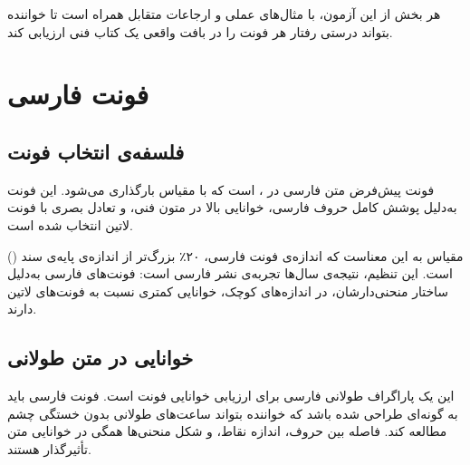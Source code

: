 \documentclass{matinbook}
\begin{document}
هر بخش از این آزمون، با مثال‌های عملی و ارجاعات متقابل همراه است
تا خواننده بتواند درستی رفتار هر فونت را در بافت واقعی یک کتاب
فنی ارزیابی کند.

\clearpage

\tableofcontents
\clearpage

\listoffigures
\clearpage

\listoftables
\clearpage

\mainmatter
\mainmattergeometry

\chapter{فونت فارسی}
\label{chap:font-persian}

\section{فلسفه‌ی انتخاب فونت}
\label{sec:font-persian-philosophy}

فونت پیش‌فرض متن فارسی در ،  است
که با مقیاس  بارگذاری می‌شود. این فونت به‌دلیل پوشش کامل
حروف فارسی، خوانایی بالا در متون فنی، و تعادل بصری با فونت لاتین
 انتخاب شده است.

مقیاس  به این معناست که اندازه‌ی فونت فارسی، ۲۰٪ بزرگ‌تر از
اندازه‌ی پایه‌ی سند (\pnum{۱۰pt}) است. این تنظیم، نتیجه‌ی سال‌ها تجربه‌ی
نشر فارسی است: فونت‌های فارسی به‌دلیل ساختار منحنی‌دارشان، در
اندازه‌های کوچک، خوانایی کمتری نسبت به فونت‌های لاتین دارند.


\section{خوانایی در متن طولانی}
\label{sec:font-persian-readability}

این یک پاراگراف طولانی فارسی برای ارزیابی خوانایی فونت
 است. فونت فارسی باید به گونه‌ای طراحی شده باشد
که خواننده بتواند ساعت‌های طولانی بدون خستگی چشم مطالعه کند.
فاصله بین حروف، اندازه نقاط، و شکل منحنی‌ها همگی در خوانایی
متن تأثیرگذار هستند.
\end{document}
